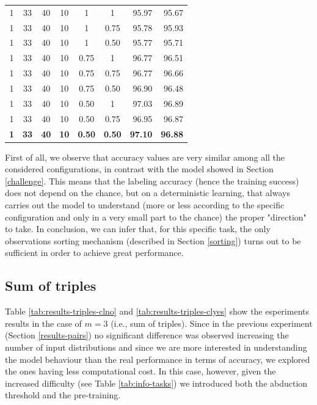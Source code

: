 \begin{table}[H]
\begin{tabular}{ccccccrr}
	1      		& 33     			& 40     		& 10     			& 1      				& 1      				& 95.97    				& 95.67\\
	1      		& 33     			& 40     		& 10     			& 1      				& 0.75    				& 95.78    				& 95.93\\
	1      		& 33     			& 40     		& 10     			& 1      				& 0.50    				& 95.77    				& 95.71\\
	1      		& 33    			& 40     		& 10     			& 0.75    				& 1      				& 96.77    				& 96.51\\
	1      		& 33     			& 40    		& 10     			& 0.75    				& 0.75    				& 96.77    				& 96.66\\ 	
	1      		& 33     			& 40     		& 10     			& 0.75				    & 0.50				    & 96.90				    & 96.48\\ 
	1      		& 33     			& 40     		& 10     			& 0.50    				& 1      				& 97.03    				& 96.89\\ 
	1      		& 33     			& 40     		& 10     			& 0.50    				& 0.75					& 96.95					& 96.87\\ 			
	\textbf{1} 	& \textbf{33}     	& \textbf{40}   & \textbf{10}		& \textbf{0.50}    		& \textbf{0.50}    		& \textbf{97.10}    	& \textbf{96.88}\\
    \bottomrule
  \end{tabular}
\end{table}

\newpage
First of all, we observe that accuracy values are very similar among all the considered configurations, in contrast with the model showed in Section \ref{challenge}. This means that the labeling accuracy (hence the training success) does not depend on the chance, but on a deterministic learning, that always carries out the model to understand (more or less according to the specific configuration and only in a very small part to the chance) the proper "direction" to take. In conclusion, we can infer that, for this specific task, the only observations sorting mechanism (described in Section \ref{sorting}) turns out to be sufficient in order to achieve great performance.

\subsection{Sum of triples}
Table \ref{tab:results-triples-clno} and \ref{tab:results-triples-clyes} show the esperiments results in the case of $m=3$ (i.e., sum of triples). Since in the previous experiment (Section \ref{results-pairs}) no significant difference was observed increasing the number of input distributions and since we are more interested in understanding the model behaviour than the real performance in terms of accuracy, we explored the ones having less computational cost. In this case, however, given the increased difficulty (see Table \ref{tab:info-tasks}) we introduced both the abduction threshold and the pre-training. 

